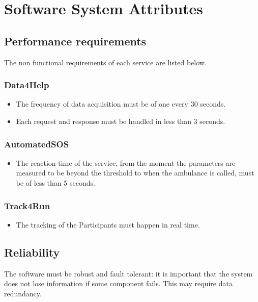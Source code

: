 \section{Software System Attributes}
    \subsection{Performance requirements}
        The non functional requirements of each service are listed below.
        \subsubsection{Data4Help}
            \begin{itemize}
                \item The frequency of data acquisition must be of one every 30 seconds.
                \item Each request and response must be handled in less than 3 seconds.
            \end{itemize}
            
        \subsubsection{AutomatedSOS}
            \begin{itemize}
                \item The reaction time of the service, from the moment the parameters are measured to be beyond the threshold to when the ambulance is called, must be of less than 5 seconds.
            \end{itemize}
            
        \subsubsection{Track4Run}
            \begin{itemize}
                \item The tracking of the Participants must happen in real time.
            \end{itemize}
            
    \subsection{Reliability}
        The software must be robust and fault tolerant: it is important that the system does not lose information if some component fails. This may require data redundancy.
        
